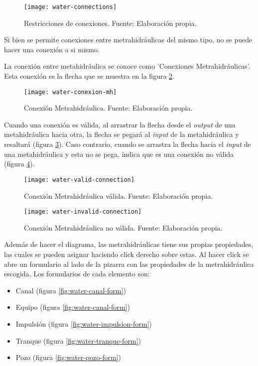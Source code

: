 \begin{figure}[H]
	\centering
	\texttt{[image: water-connections]}
	\caption{\label{fig:water-connections} Restricciones de conexiones. Fuente: Elaboración propia.}
\end{figure}

Si bien se permite conexiones entre metrahidráulicas del mismo tipo, no se puede hacer una conexión a si mismo.

La conexión entre metahidráulica se conoce como 'Conexiones Metrahidráulicas'. Esta conexión es la flecha que se muestra en la figura \ref{fig:water-conexion-mh}.

\begin{figure}[H]
	\centering
	\texttt{[image: water-conexion-mh]}
	\caption{\label{fig:water-conexion-mh} Conexión Metrahidráulica. Fuente: Elaboración propia.}
\end{figure}

Cuando una conexión es válida, al arrastrar la flecha desde el \textit{output} de una metahidráulica hacia otra, la flecha se pegará al \textit{input} de la metahidráulica y resaltará (figura \ref{fig:water-valid-connection}). Caso contrario, cuando se arrastra la flecha hacia el \textit{input} de una metahidráulica y esta no se pega, indica que es una conexión no válida (figura \ref{fig:water-invalid-connection}).

\begin{figure}[H]
	\centering
	\texttt{[image: water-valid-connection]}
	\caption{\label{fig:water-valid-connection} Conexión Metrahidráulica válida. Fuente: Elaboración propia.}
\end{figure}

\begin{figure}[H]
	\centering
	\texttt{[image: water-invalid-connection]}
	\caption{\label{fig:water-invalid-connection} Conexión Metrahidráulica no válida. Fuente: Elaboración propia.}
\end{figure}

Además de hacer el diagrama, las metrahidráulicas tiene sus propias propiedades, las cuales se pueden asignar haciendo click derecho sobre estas. Al hacer click se abre un formulario al lado de la pizarra con las propiedades de la metrahidráulica escogida.
Los formularios de cada elemento son:
\begin{itemize}
    \item Canal (figura \ref{fig:water-canal-form})
    \item Equipo (figura \ref{fig:water-canal-form})
    \item Impulsión (figura \ref{fig:water-impulsion-form})
    \item Tranque (figura \ref{fig:water-tranque-form})
    \item Pozo (figura \ref{fig:water-pozo-form})
\end{itemize}

